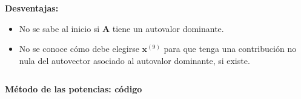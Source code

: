 \documentclass[9pt, aspectratio=169]{beamer}
\begin{document}
\begin{frame}
\textbf{Desventajas:}
\begin{itemize}
    \item No se sabe al inicio si $\bm{A}$ tiene un autovalor dominante.
    \item No se conoce cómo debe elegirse $\bm{x}^{(9)}$ para que tenga una contribución no nula del autovector asociado al autovalor dominante, si existe.
\end{itemize}
\end{frame}

\begin{frame}[fragile]

\begin{columns}[t]
\textbf{Método de las potencias: código}


\end{columns}
\end{frame}
\end{document}
